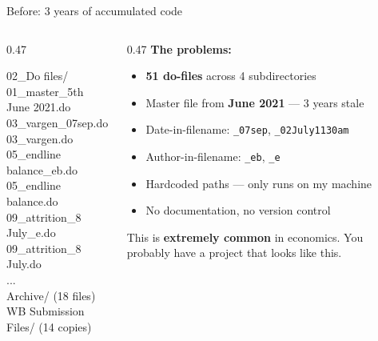 \documentclass[aspectratio=169, 10pt]{beamer}
\begin{document}
\begin{frame}[fragile]{Before: 3 years of accumulated code}
\vskip-4pt
\begin{columns}[T]
\begin{column}{0.47\textwidth}
\begin{tcolorbox}[colback=DarkSlate, colframe=SoftCoral, boxrule=0.8pt, arc=2pt,
  left=4pt, right=4pt, top=3pt, bottom=3pt]
{\color{CoolGray}\ttfamily\tiny
02\_Do files/\\
\hspace{0.6em}01\_master\_5th June 2021.do\\
\hspace{0.6em}03\_vargen\_07sep.do\\
\hspace{0.6em}03\_vargen.do\\
\hspace{0.6em}05\_endline balance\_eb.do\\
\hspace{0.6em}05\_endline balance.do\\
\hspace{0.6em}09\_attrition\_8 July\_e.do\\
\hspace{0.6em}09\_attrition\_8 July.do\\
\hspace{0.6em}...\\
\hspace{0.6em}Archive/ {\color{CoolGray!50}(18 files)}\\
\hspace{0.6em}WB Submission Files/ {\color{CoolGray!50}(14 copies)}
}
\end{tcolorbox}
\end{column}
\begin{column}{0.47\textwidth}
{\small\color{SoftCoral}\textbf{The problems:}}
\vskip3pt
\small
\begin{itemize}\setlength{\itemsep}{2pt}
  \item \textbf{51 do-files} across 4 subdirectories
  \item Master file from \textbf{June 2021} --- 3 years stale
  \item Date-in-filename: \texttt{\_07sep}, \texttt{\_02July1130am}
  \item Author-in-filename: \texttt{\_eb}, \texttt{\_e}
  \item Hardcoded paths --- only runs on my machine
  \item No documentation, no version control
\end{itemize}
\vskip3pt
\begin{tcolorbox}[quotebox, top=2pt, bottom=2pt]
\scriptsize This is \textbf{extremely common} in economics. You probably have a project that looks like this.
\end{tcolorbox}
\end{column}
\end{columns}
\end{frame}
\end{document}
